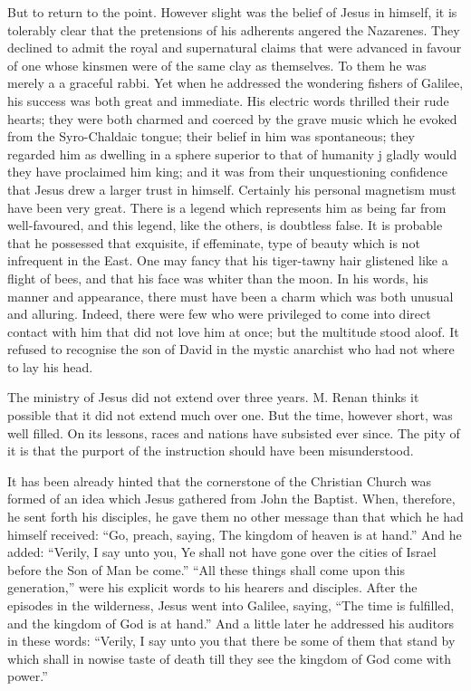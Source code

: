 \documentclass[]{book}
\begin{document}
But to return to the point. However slight was the belief of Jesus in
himself, it is tolerably clear that the pretensions of his adherents
angered the Nazarenes. They declined to admit the royal and supernatural
claims that were advanced in favour of one whose kinsmen were of the
same clay as themselves. To them he was merely a a graceful rabbi. Yet
when he addressed the wondering fishers of Galilee, his success was both
great and immediate. His electric words thrilled their rude hearts; they
were both charmed and coerced by the grave music which he evoked from
the Syro-Chaldaic tongue; their belief in him was spontaneous; they
regarded him as dwelling in a sphere superior to that of humanity j
gladly would they have proclaimed him king; and it was from their
unquestioning confidence that Jesus drew a larger trust in himself.
Certainly his personal magnetism must have been very great. There is a
legend which represents him as being far from well-favoured, and this
legend, like the others, is doubtless false. It is probable that he
possessed that exquisite, if effeminate, type of beauty which is not
infrequent in the East. One may fancy that his tiger-tawny hair
glistened like a flight of bees, and that his face was whiter than the
moon. In his words, his manner and appearance, there must have been a
charm which was both unusual and alluring. Indeed, there were few who
were privileged to come into direct contact with him that did not love
him at once; but the multitude stood aloof. It refused to recognise the
son of David in the mystic anarchist who had not where to lay his head.

The ministry of Jesus did not extend over three years. M. Renan thinks
it possible that it did not extend much over one. But the time, however
short, was well filled. On its lessons, races and nations have subsisted
ever since. The pity of it is that the purport of the instruction should
have been misunderstood.

It has been already hinted that the cornerstone of the Christian Church
was formed of an idea which Jesus gathered from John the Baptist. When,
therefore, he sent forth his disciples, he gave them no other message
than that which he had himself received: ``Go, preach, saying, The
kingdom of heaven is at hand.'' And he added: ``Verily, I say unto you,
Ye shall not have gone over the cities of Israel before the Son of Man
be come.'' ``All these things shall come upon this generation,'' were
his explicit words to his hearers and disciples. After the episodes in
the wilderness, Jesus went into Galilee, saying, ``The time is
fulfilled, and the kingdom of God is at hand.'' And a little later he
addressed his auditors in these words: ``Verily, I say unto you that
there be some of them that stand by which shall in nowise taste of death
till they see the kingdom of God come with power.''
\end{document}
